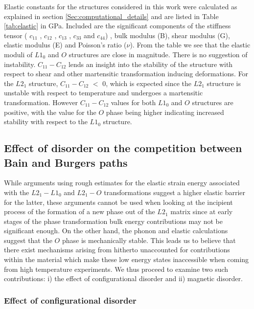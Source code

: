\documentclass[%
preprint,
 amsmath,amssymb,
 aps,
prb,
showkeys,
]{revtex4-1}
\begin{document}
Elastic constants for the structures considered in this work were calculated  as explained in section \ref{Sec:computational_details} and are listed in Table \ref{tab:elastic} in GPa. Included are the significant components of the stiffness tensor ( $c_{11}$ , $c_{12}$ , $c_{13}$ , $c_{33}$  and  $c_{44}$) , bulk modulus (B), shear modulus (G), elastic modulus (E) and Poisson's ratio ($\nu$). From the table we see that the elastic moduli of $L1_0$ and $O$ structures are close in magnitude. There is no suggestion of instability. $C_{11}-C_{12}$  lends an insight into the stability of the structure with respect to shear and other martensitic transformation inducing deformations. For the $L2_1$ structure,  $C_{11}-C_{12}$  $<$ $0$, which is expected since the $L2_1$ structure is  unstable with respect to temperature and undergoes a martensitic transformation. However $C_{11}-C_{12}$  values for both $L1_0$ and $O$ structures are positive,  with the value for the $O$ phase being higher indicating increased stability with respect to the $L1_0$ structure.


\subsection{Effect of disorder on the competition between Bain and Burgers paths} 

While arguments using rough estimates for the elastic strain energy associated with the $L2_1-L1_0$ and $L2_1-O$ transformations suggest a higher elastic barrier for the latter, these arguments cannot be used when looking at the incipient process of the formation of a new phase out of the $L2_1$ matrix since at early stages of the phase transformation bulk energy contributions may not be significant enough. On the other hand, the phonon and elastic calculations suggest that the $O$ phase is mechanically stable. This leads us to believe that there exist mechanisms arising from hitherto unaccounted for contributions within the material which make these low energy states inaccessible when coming from high temperature experiments. We thus proceed to examine two such contributions: i) the effect of configurational disorder and ii) magnetic disorder.

\subsubsection{Effect of configurational disorder}
\end{document}
